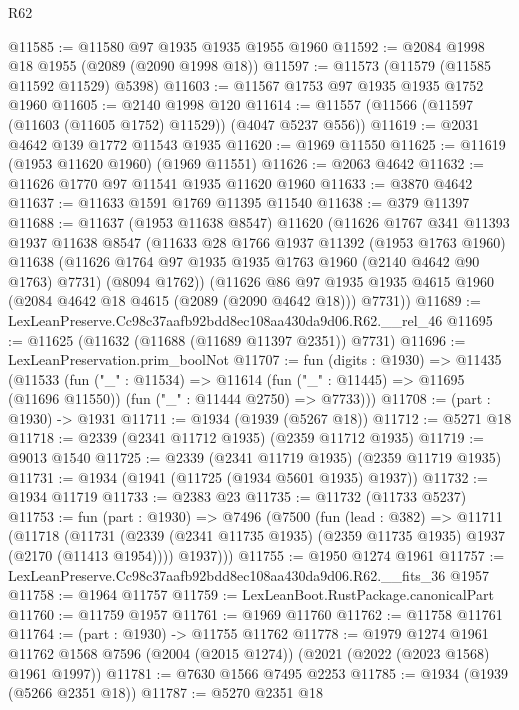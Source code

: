 \begin{lexlean}{R62}
\begin{coremodule}
@11585 := @11580 @97 @1935 @1935 @1955 @1960
@11592 := @2084 @1998 @18 @1955 (@2089 (@2090 @1998 @18))
@11597 := @11573 (@11579 (@11585 @11592 @11529) @5398)
@11603 := @11567 @1753 @97 @1935 @1935 @1752 @1960
@11605 := @2140 @1998 @120
@11614 := @11557 (@11566 (@11597 (@11603 (@11605 @1752) @11529)) (@4047 @5237 @556))
@11619 := @2031 @4642 @139 @1772 @11543 @1935
@11620 := @1969 @11550
@11625 := @11619 (@1953 @11620 @1960) (@1969 @11551)
@11626 := @2063 @4642
@11632 := @11626 @1770 @97 @11541 @1935 @11620 @1960
@11633 := @3870 @4642
@11637 := @11633 @1591 @1769 @11395 @11540
@11638 := @379 @11397
@11688 := @11637
    (@1953 @11638 @8547)
    @11620
    (@11626
      @1767
      @341
      @11393
      @1937
      @11638
      @8547
      (@11633
        @28
        @1766
        @1937
        @11392
        (@1953 @1763 @1960)
        @11638
        (@11626 @1764 @97 @1935 @1935 @1763 @1960 (@2140 @4642 @90 @1763) @7731)
        (@8094 @1762))
      (@11626
        @86
        @97
        @1935
        @1935
        @4615
        @1960
        (@2084 @4642 @18 @4615 (@2089 (@2090 @4642 @18)))
        @7731))
@11689 := LexLeanPreserve.Cc98c37aafb92bdd8ec108aa430da9d06.R62.__rel_46
@11695 := @11625 (@11632 (@11688 (@11689 @11397 @2351)) @7731)
@11696 := LexLeanPreservation.prim_boolNot
@11707 := fun (digits : @1930) =>
  @11435
    (@11533
      (fun ("_" : @11534) =>
      @11614 (fun ("_" : @11445) => @11695 (@11696 @11550)) (fun ("_" : @11444 @2750) => @7733)))
@11708 := (part : @1930) -> @1931
@11711 := @1934 (@1939 (@5267 @18))
@11712 := @5271 @18
@11718 := @2339 (@2341 @11712 @1935) (@2359 @11712 @1935)
@11719 := @9013 @1540
@11725 := @2339 (@2341 @11719 @1935) (@2359 @11719 @1935)
@11731 := @1934 (@1941 (@11725 (@1934 @5601 @1935) @1937))
@11732 := @1934 @11719
@11733 := @2383 @23
@11735 := @11732 (@11733 @5237)
@11753 := fun (part : @1930) =>
  @7496
    (@7500
      (fun (lead : @382) =>
      @11711
        (@11718
          (@11731 (@2339 (@2341 @11735 @1935) (@2359 @11735 @1935) @1937 (@2170 (@11413 @1954))))
          @1937)))
@11755 := @1950 @1274 @1961
@11757 := LexLeanPreserve.Cc98c37aafb92bdd8ec108aa430da9d06.R62.__fits_36 @1957
@11758 := @1964 @11757
@11759 := LexLeanBoot.RustPackage.canonicalPart
@11760 := @11759 @1957
@11761 := @1969 @11760
@11762 := @11758 @11761
@11764 := (part : @1930) -> @11755 @11762
@11778 := @1979
    @1274
    @1961
    @11762
    @1568
    @7596
    (@2004 (@2015 @1274))
    (@2021 (@2022 (@2023 @1568) @1961 @1997))
@11781 := @7630 @1566 @7495 @2253
@11785 := @1934 (@1939 (@5266 @2351 @18))
@11787 := @5270 @2351 @18

\end{coremodule}
\end{lexlean}
